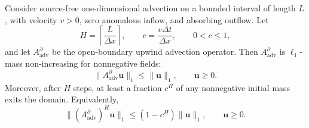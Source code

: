 
\begin{lemma}
\label{lem:finite_time_leakage_advection}
Consider source-free one-dimensional advection on a bounded interval of
length \(L\), with velocity \(v>0\), zero anomalous inflow, and absorbing
outflow. Let
\[
H=\left\lceil \frac{L}{\Delta x}\right\rceil,
\qquad
c=\frac{v\Delta t}{\Delta x},
\qquad
0<c\le 1,
\]
and let \(A_{\mathrm{adv}}^{\partial}\) be the open-boundary upwind
advection operator. Then \(A_{\mathrm{adv}}^{\partial}\) is
\(\ell_1\)-mass non-increasing for nonnegative fields:
\[
\|A_{\mathrm{adv}}^{\partial}\mathbf u\|_1
\le
\|\mathbf u\|_1,
\qquad
\mathbf u\ge 0.
\]
Moreover, after \(H\) steps, at least a fraction \(c^H\) of any
nonnegative initial mass exits the domain. Equivalently,
\begin{equation}
\|(A_{\mathrm{adv}}^{\partial})^{H}\mathbf u\|_1
\le
(1-c^H)\|\mathbf u\|_1,
\qquad
\mathbf u\ge 0.
\label{eq:adv_leakage_derived}
\end{equation}
\end{lemma}

